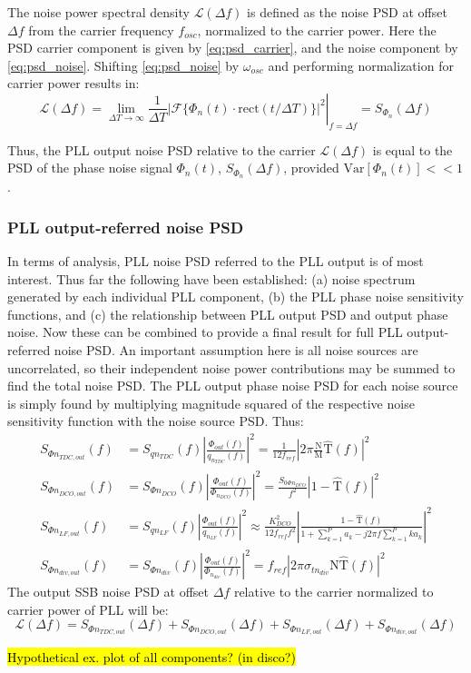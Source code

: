 	 The noise power spectral density $\mathcal{L}(\Delta f)$ is defined as the noise PSD at offset $\Delta f$ from the carrier frequency $f_{osc}$, normalized to the carrier power. Here the PSD carrier component is given by \ref{eq:psd_carrier}, and the noise component by \ref{eq:psd_noise}. Shifting \ref{eq:psd_noise} by $\omega_{osc}$ and performing normalization for carrier power results in:
	\begin{equation}\label{eq:pn_psd_relation}
		\mathcal{L}(\Delta f) = \left.\lim_{\Delta T\rightarrow\infty}\frac{1}{\Delta T}|\mathcal{F}\{\Phi_{n}(t)\cdot\mathrm{rect}(t/\Delta T)\}|^2 \right|_{f=\Delta f}= S_{\Phi_{n}}(\Delta f)
	\end{equation}

	Thus, the PLL output noise PSD relative to the carrier $\mathcal{L}(\Delta f)$ is equal to the PSD of the phase noise signal $\Phi_{n}(t)$, $S_{\Phi_{n}}(\Delta f)$, provided $\text{Var}[\Phi_{n}(t)] << 1$. 

\subsubsection{PLL output-referred noise PSD}
In terms of analysis, PLL noise PSD referred to the PLL output is of most interest. Thus far the following have been established: (a) noise spectrum generated by each individual PLL component, (b) the PLL phase noise sensitivity functions, and (c) the relationship between PLL output PSD and output phase noise. Now these can be combined to provide a final result for full PLL output-referred noise PSD. An important assumption here is all noise sources are uncorrelated, so their independent noise power contributions may be summed to find the total noise PSD. The PLL output phase noise PSD for each noise source is simply found by multiplying magnitude squared of the respective noise sensitivity function with the noise source PSD. Thus:
\begin{align}
	S_{\Phi n_{TDC,out}}(f) &= S_{qn_{TDC}}(f)\left|\frac{\Phi_{out}(f)}{q_{n_{TDC}}(f)}\right|^2 = \frac{1}{12f_{ref}}\left|2\pi\frac{\mathrm{N}}{\mathrm{M}}\hat{\mathrm{T}}(f)\right|^2\\
	S_{\Phi n_{DCO,out}}(f) &= S_{\Phi n_{DCO}}(f)\left|\frac{\Phi_{out}(f)}{\Phi_{n_{DCO}}(f)}\right|^2  = \frac{S_{0\Phi n_{DCO}}}{f^2}\left|1-\hat{\mathrm{T}}(f)\right|^2\\		
	S_{\Phi n_{LF,out}}(f) &= S_{q n_{LF}}(f)\left|\frac{\Phi_{out}(f)}{q_{n_{LF}}(f)}\right|^2 \approx \frac{K_{DCO}^2}{12f_{ref}f^2}\left|\frac{1-\hat{\mathrm{T}}(f)}{1+\sum_{k=1}^P a_k - j2\pi f\sum_{k=1}^P ka_k}\right|^2\\
	S_{\Phi n_{div,out}}(f) &= S_{\Phi n_{div}}(f)\left|\frac{\Phi_{out}(f)}{\Phi_{n_{div}}(f)}\right|^2 = f_{ref}\left|2\pi\sigma_{tn_{div}}\mathrm{N}\hat{\mathrm{T}}(f)\right|^2
\end{align}
The output SSB noise PSD at offset $\Delta f$ relative to the carrier normalized to carrier power of PLL will be:
\begin{equation}
	\mathcal{L}(\Delta f) = S_{\Phi n_{TDC,out}}(\Delta f) + S_{\Phi n_{DCO,out}}(\Delta f) + S_{\Phi n_{LF,out}}(\Delta f) + S_{\Phi n_{div,out}}(\Delta f)
\end{equation}



\hl{Hypothetical ex. plot of all components? (in disco?)}




